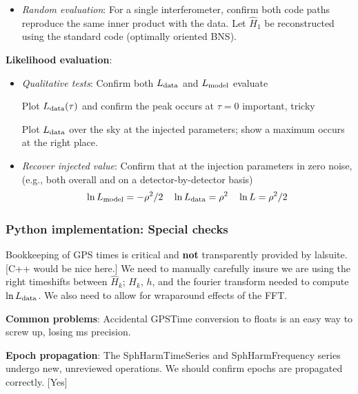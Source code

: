 \documentclass[twocolumn,prd,nofootinbib]{revtex4}
\newcommand\editremark[1]{{\color{red} #1}}
\begin{document}
\begin{widetext}
\begin{itemize}
\item \emph{Random evaluation}: For a single interferometer, confirm both code paths reproduce the same inner product
  with the data.   Let $\hat{H}_1$ be reconstructed using the standard code (optimally oriented BNS).
\end{itemize}

\noindent \textbf{Likelihood evaluation}:
\begin{itemize}
\item \emph{Qualitative tests}:  Confirm both $L_{\rm data}$ and $L_{\rm model}$ evaluate

Plot  $L_{\rm data}(\tau)$ and confirm the peak occurs at $\tau=0$ \editremark{important, tricky}

Plot $L_{\rm data}$ over the sky at the injected parameters; show a maximum occurs at the right place.

\item \emph{Recover injected value}: Confirm that at the injection parameters in zero noise, (e.g., both overall and on
  a detector-by-detector basis)
\[
\ln L_{\rm model}=-\rho^2/2 \quad 
\ln L_{\rm data} = \rho^2 \quad
\ln L = \rho^2/2
\]
\end{itemize}


\subsubsection{Python implementation: Special checks}

Bookkeeping of GPS times is critical and
\textbf{not} transparently provided by lalsuite.  [C++ would be nice here.]  We need to
manually carefully insure we are using the right timeshifts between $\hat{H}_k$; $H_k$,
$h$, and the fourier transform needed to compute $\ln L_{\rm data}$.    We also need to allow for wraparound effects of
the FFT.
%
\begin{shaded}
\noindent \textbf{Common problems}: Accidental  GPSTime conversion to floats is an easy way to screw up, losing ms precision.
\end{shaded}


\noindent \textbf{Epoch propagation}: The SphHarmTimeSeries and SphHarmFrequency series undergo new, unreviewed
operations.  We should confirm epochs are propagated correctly.  [Yes]


\end{widetext}
\end{document}
